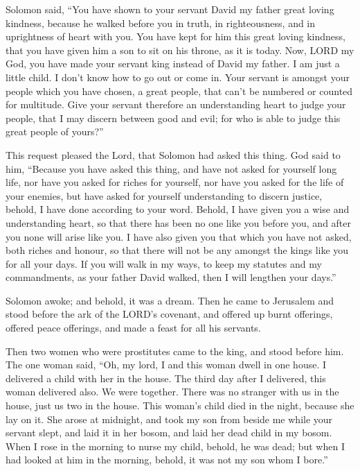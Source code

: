  Solomon said, ``You have shown to your servant David my
father great loving kindness, because he walked before you in truth, in
righteousness, and in uprightness of heart with you. You have kept for
him this great loving kindness, that you have given him a son to sit on
his throne, as it is today.  Now, LORD my God, you have made
your servant king instead of David my father. I am just a little child.
I don't know how to go out or come in.  Your servant is
amongst your people which you have chosen, a great people, that can't be
numbered or counted for multitude.  Give your servant
therefore an understanding heart to judge your people, that I may
discern between good and evil; for who is able to judge this great
people of yours?''

 This request pleased the Lord, that Solomon had asked this
thing.  God said to him, ``Because you have asked this
thing, and have not asked for yourself long life, nor have you asked for
riches for yourself, nor have you asked for the life of your enemies,
but have asked for yourself understanding to discern justice,
 behold, I have done according to your word. Behold, I have
given you a wise and understanding heart, so that there has been no one
like you before you, and after you none will arise like you.
 I have also given you that which you have not asked, both
riches and honour, so that there will not be any amongst the kings like
you for all your days.  If you will walk in my ways, to
keep my statutes and my commandments, as your father David walked, then
I will lengthen your days.''

 Solomon awoke; and behold, it was a dream. Then he came to
Jerusalem and stood before the ark of the LORD's covenant, and offered
up burnt offerings, offered peace offerings, and made a feast for all
his servants.

 Then two women who were prostitutes came to the king, and
stood before him.  The one woman said, ``Oh, my lord, I and
this woman dwell in one house. I delivered a child with her in the
house.  The third day after I delivered, this woman
delivered also. We were together. There was no stranger with us in the
house, just us two in the house.  This woman's child died
in the night, because she lay on it.  She arose at
midnight, and took my son from beside me while your servant slept, and
laid it in her bosom, and laid her dead child in my bosom. 
When I rose in the morning to nurse my child, behold, he was dead; but
when I had looked at him in the morning, behold, it was not my son whom
I bore.''

